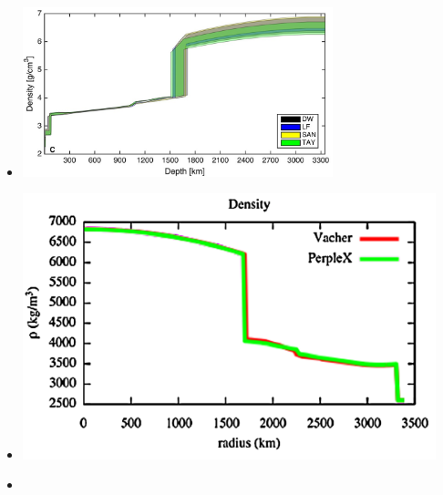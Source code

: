 \begin{itemize}
\item {}

\begin{center}
\includegraphics[width=9cm]{images/mars/density/khlr18}
\end{center}

\item {}

\begin{center}
\includegraphics[width=12cm]{images/mars/density/smls19d}
\end{center}

\item {}


\end{itemize}
